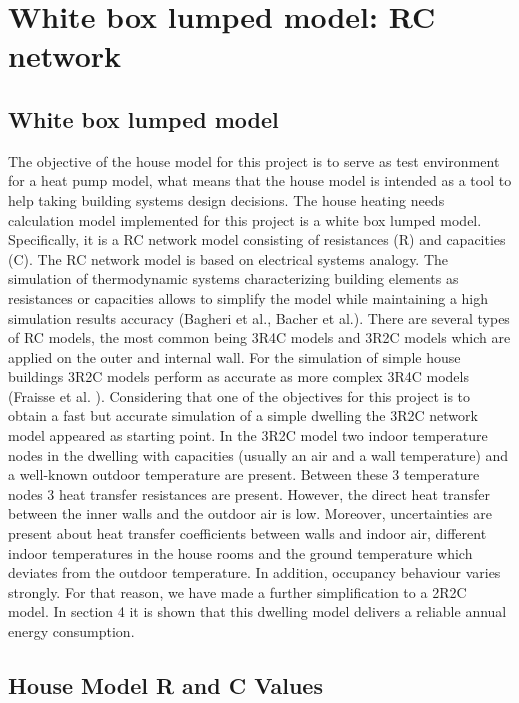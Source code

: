 \section{White box lumped model: RC network}
\subsection{White box lumped model}

The objective of the house model for this project is to serve as test environment for a heat pump model, what means that the house model is intended as a tool to help taking building systems design decisions. The house heating needs calculation model implemented for this project is a white box lumped model. Specifically, it is a RC network model consisting of resistances (R) and capacities (C). The RC network model is based on electrical systems analogy. The simulation of thermodynamic systems characterizing building elements as resistances or capacities allows to simplify the model while maintaining a high simulation results accuracy (Bagheri et al., Bacher et al.).  
There are several types of RC models, the most common being 3R4C models and 3R2C models which are applied on the outer and internal wall. For the simulation of simple house buildings 3R2C models perform as accurate as more complex 3R4C models (Fraisse et al. ). Considering that one of the objectives for this project is to obtain a fast but accurate simulation of a simple dwelling the 3R2C network model appeared as starting point. In the 3R2C model two indoor temperature nodes in the dwelling with capacities (usually an air and a wall temperature) and a well-known outdoor temperature are present. Between these 3 temperature nodes 3 heat transfer resistances are present. However, the direct heat transfer between the inner walls and the outdoor air is low. Moreover, uncertainties are present about heat transfer coefficients between walls and indoor air, different indoor temperatures in the house rooms and the ground temperature which deviates from the outdoor temperature. In addition, occupancy behaviour varies strongly. For that reason, we have made a further simplification to a 2R2C model. In section 4 it is shown that this dwelling model delivers a reliable annual energy consumption.


\subsection{House Model R and C Values}

